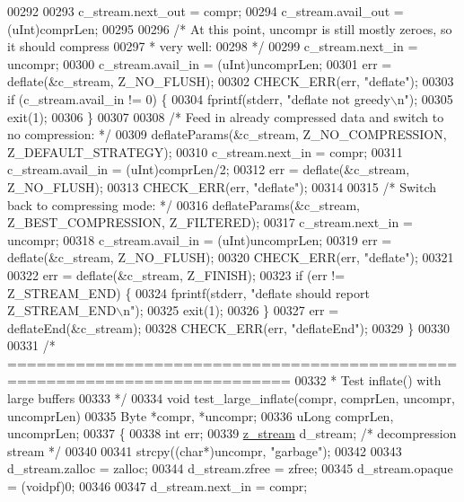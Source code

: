\begin{DoxyCode}
{{{{{{{{{{{{00292 
00293     c\_stream.next\_out = compr;
00294     c\_stream.avail\_out = (uInt)comprLen;
00295 
00296     \textcolor{comment}{/* At this point, uncompr is still mostly zeroes, so it should compress}
00297 \textcolor{comment}{     * very well:}
00298 \textcolor{comment}{     */}
00299     c\_stream.next\_in = uncompr;
00300     c\_stream.avail\_in = (uInt)uncomprLen;
00301     err = deflate(&c\_stream, Z\_NO\_FLUSH);
00302     CHECK\_ERR(err, \textcolor{stringliteral}{"deflate"});
00303     \textcolor{keywordflow}{if} (c\_stream.avail\_in != 0) \{
00304         fprintf(stderr, \textcolor{stringliteral}{"deflate not greedy\(\backslash\)n"});
00305         exit(1);
00306     \}
00307 
00308     \textcolor{comment}{/* Feed in already compressed data and switch to no compression: */}
00309     deflateParams(&c\_stream, Z\_NO\_COMPRESSION, Z\_DEFAULT\_STRATEGY);
00310     c\_stream.next\_in = compr;
00311     c\_stream.avail\_in = (uInt)comprLen/2;
00312     err = deflate(&c\_stream, Z\_NO\_FLUSH);
00313     CHECK\_ERR(err, \textcolor{stringliteral}{"deflate"});
00314 
00315     \textcolor{comment}{/* Switch back to compressing mode: */}
00316     deflateParams(&c\_stream, Z\_BEST\_COMPRESSION, Z\_FILTERED);
00317     c\_stream.next\_in = uncompr;
00318     c\_stream.avail\_in = (uInt)uncomprLen;
00319     err = deflate(&c\_stream, Z\_NO\_FLUSH);
00320     CHECK\_ERR(err, \textcolor{stringliteral}{"deflate"});
00321 
00322     err = deflate(&c\_stream, Z\_FINISH);
00323     \textcolor{keywordflow}{if} (err != Z\_STREAM\_END) \{
00324         fprintf(stderr, \textcolor{stringliteral}{"deflate should report Z\_STREAM\_END\(\backslash\)n"});
00325         exit(1);
00326     \}
00327     err = deflateEnd(&c\_stream);
00328     CHECK\_ERR(err, \textcolor{stringliteral}{"deflateEnd"});
00329 \}
00330 
00331 \textcolor{comment}{/* ===========================================================================}
00332 \textcolor{comment}{ * Test inflate() with large buffers}
00333 \textcolor{comment}{ */}
00334 \textcolor{keywordtype}{void} test\_large\_inflate(compr, comprLen, uncompr, uncomprLen)
00335     Byte *compr, *uncompr;
00336     uLong comprLen, uncomprLen;
00337 \{
00338     \textcolor{keywordtype}{int} err;
00339     \hyperlink{structz__stream__s}{z\_stream} d\_stream; \textcolor{comment}{/* decompression stream */}
00340 
00341     strcpy((\textcolor{keywordtype}{char}*)uncompr, \textcolor{stringliteral}{"garbage"});
00342 
00343     d\_stream.zalloc = zalloc;
00344     d\_stream.zfree = zfree;
00345     d\_stream.opaque = (voidpf)0;
00346 
00347     d\_stream.next\_in  = compr;
}}}}}}}}}}}}
\end{DoxyCode}
